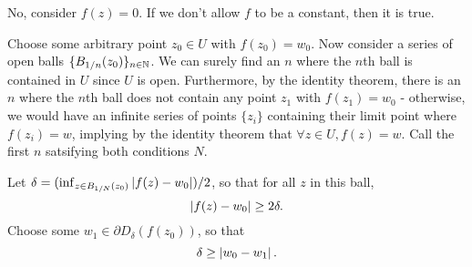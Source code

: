 \documentclass{homework}
\begin{document}
                                                                                                                                                                                                                \begin{solution}
                                                                                                                                                                                                                No, consider $f(z)=0$. If we don't allow $f$ to be a constant, then it is true.

                                                                                                                                                                                                                Choose some arbitrary point $z_0\in U$ with $f(z_0)=w_0$. Now consider a series of open balls $\{B_{1/n}(z_0)\}_{n\in\mathbb{N}}$. We can surely find an $n$ where the $n$th ball is contained in $U$ since $U$ is open. Furthermore, by the identity theorem, there is an $n$ where the $n$th ball does not contain any point $z_1$ with $f(z_1)=w_0$ - otherwise, we would have an infinite series of points $\{z_i\}$ containing their limit point where $f(z_i)=w$, implying by the identity theorem that $\forall z\in U, f(z) = w$. Call the first $n$ satsifying both conditions $N$.

                                                                                                                                                                                                                Let $\delta = (\inf_{z\in B_{1/N}(z_0)}\left|f(z)-w_0\right|)/2$, so that for all $z$ in this ball,
                                                                                                                                                                                                                \[
                                                                                                                                                                                                                \left|f(z) - w_0 \right| \geq 2\delta.
                                                                                                                                                                                                                \]
                                                                                                                                                                                                                Choose some $w_1\in \partial D_\delta (f(z_0))$, so that 
                                                                                                                                                                                                                \[\delta \geq \left|w_0-w_1\right|.
                                                                                                                                                                                                                \]


\end{solution}
\end{document}
